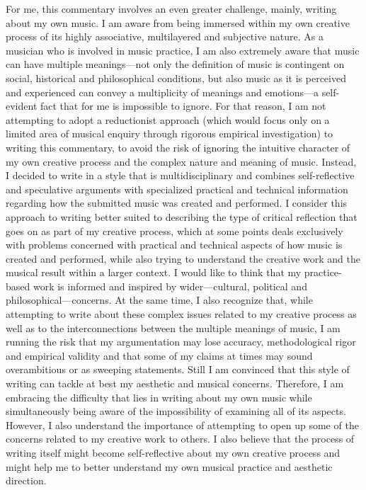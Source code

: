 For me, this commentary involves an even greater challenge, mainly, writing about my own music. I am aware from being immersed within my own creative process of its highly associative, multilayered and subjective nature.  As a musician who is involved in music practice, I am also extremely aware that music can have multiple meanings---not only the definition of music is contingent on social, historical and philosophical conditions, but also music as it is perceived and experienced can convey a multiplicity of meanings and emotions---a self-evident fact that for me is impossible to ignore. For that reason, I am not attempting to adopt a reductionist approach (which would focus only on a limited area of musical enquiry through rigorous empirical investigation) to writing this commentary, to avoid the risk of ignoring the intuitive character of my own creative process and the complex nature and meaning of music. Instead, I decided to write in a style that is multidisciplinary and combines \mbox{self-reflective} and speculative arguments with specialized practical and technical information regarding how the submitted music was created and performed. I consider this approach to writing better suited to describing the type of critical reflection that goes on as part of my creative process, which at some points deals exclusively with problems concerned with practical and technical aspects of how music is created and performed, while also trying to understand the creative work and the musical result within a larger context. I would like to think that my practice-based work is informed and inspired by wider---cultural, political and philosophical---concerns. At the same time, I also recognize that, while attempting to write about these complex issues related to my creative process as well as to the interconnections between the multiple meanings of music, I am running the risk that my argumentation may lose accuracy, methodological rigor and empirical validity and that some of my claims at times may sound overambitious or as sweeping statements. Still I am convinced that this style of writing can tackle at best my aesthetic and musical concerns. Therefore, I am embracing the difficulty that lies in writing about my own music while simultaneously being aware of the impossibility of examining all of its aspects. However, I also understand the importance of attempting to open up some of the concerns related to my creative work to others. I also believe that the process of writing itself might become self-reflective about my own creative process and might help me to better understand my own musical practice and aesthetic direction. 

